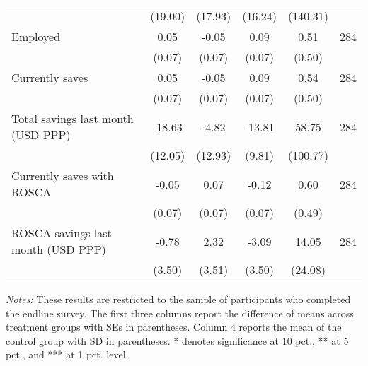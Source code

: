 \begin{table}[h]
{\begin{threeparttable}
\begin{tabular}{l*{5}{c}}
          &  (19.00)&  (17.93)&  (16.24)& (140.31)&         \\
Employed  &     0.05&    -0.05&     0.09&     0.51&      284\\
          &   (0.07)&   (0.07)&   (0.07)&   (0.50)&         \\
Currently saves&     0.05&    -0.05&     0.09&     0.54&      284\\
          &   (0.07)&   (0.07)&   (0.07)&   (0.50)&         \\
Total savings last month (USD PPP)&   -18.63&    -4.82&   -13.81&    58.75&      284\\
          &  (12.05)&  (12.93)&   (9.81)& (100.77)&         \\
Currently saves with ROSCA&    -0.05&     0.07&    -0.12&     0.60&      284\\
          &   (0.07)&   (0.07)&   (0.07)&   (0.49)&         \\
ROSCA savings last month (USD PPP)&    -0.78&     2.32&    -3.09&    14.05&      284\\
          &   (3.50)&   (3.51)&   (3.50)&  (24.08)&         \\
\bottomrule \end{tabular} \begin{tablenotes}[flushleft] \footnotesize \item \emph{Notes:} These results are restricted to the sample of participants who completed the endline survey. The first three columns report the difference of means across treatment groups with SEs in parentheses. Column 4 reports the mean of the control group with SD in parentheses. * denotes significance at 10 pct., ** at 5 pct., and *** at 1 pct. level. \end{tablenotes} \end{threeparttable} } \end{table}

